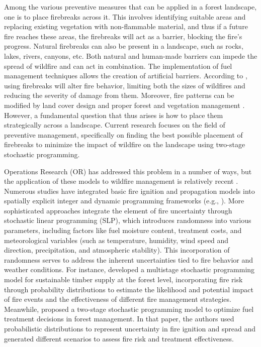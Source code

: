 \documentclass[a4paper,fleqn]{cas-sc}
\begin{document}
Among the various preventive measures that can be applied in a forest landscape, one is to place firebreaks across it. This involves identifying suitable areas and replacing existing vegetation with non-flammable material, and thus if a future fire reaches these areas, the firebreaks will act as a barrier, blocking the fire's progress. Natural firebreaks can also be present in a landscape, such as rocks, lakes, rivers, canyons, etc. Both natural and human-made barriers can impede the spread of wildfire and can act in combination. The implementation of fuel management techniques allows the creation of artificial barriers. According to \cite{agee2000use}, using firebreaks will alter fire behavior, limiting both the sizes of wildfires and reducing the severity of damage from them. Moreover, fire patterns can be modified by land cover design and proper forest and vegetation management \citep{amiro2001fire,kim2009spatial,cheney1993influence,carrasco2023firebreak}. However, a fundamental question that thus arises is how to place them strategically across a landscape. Current research focuses on the field of preventive management, specifically on finding the best possible placement of firebreaks to minimize the impact of wildfire on the landscape using two-stage stochastic programming.

Operations Research (OR) has addressed this problem in a number of ways, but the application of these models to wildfire management is relatively recent \citep{martell2007forest}. Numerous studies have integrated basic fire ignition and propagation models into spatially explicit integer and dynamic programming frameworks (e.g., \cite{bettinger2009, kim2009spatial, konoshima2008spatial, gonzalez2011integrating}). More sophisticated approaches integrate the element of fire uncertainty through stochastic linear programming (SLP), which introduces randomness into various parameters, including factors like fuel moisture content, treatment costs, and meteorological variables (such as temperature, humidity, wind speed and direction, precipitation, and atmospheric stability). This incorporation of randomness serves to address the inherent uncertainties tied to fire behavior and weather conditions. For instance, \cite{boychuk1996multistage} developed a multistage stochastic programming model for sustainable timber supply at the forest level, incorporating fire risk through probability distributions to estimate the likelihood and potential impact of fire events and the effectiveness of different fire management strategies. Meanwhile, \cite{kabli2015stochastic} proposed a two-stage stochastic programming model to optimize fuel treatment decisions in forest management. In that paper, the authors used probabilistic distributions to represent uncertainty in fire ignition and spread and generated different scenarios to assess fire risk and treatment effectiveness.
\end{document}

